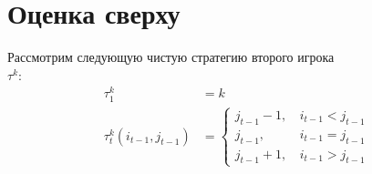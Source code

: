 \section{Оценка сверху}
\label{sec:upper_bound}
Рассмотрим следующую чистую стратегию второго игрока\\
$ \tau^k $:
\begin{equation}
\label{eq:strategy:sp}
\begin{aligned}
\tau_1^k &= k \\
\tau_t^k(i_{t-1}, j_{t-1}) &= \begin{cases}
    j_{t-1} - 1, &\, i_{t-1} < j_{t-1} \\
    j_{t-1}, &\, i_{t-1} = j_{t-1} \\
    j_{t-1} + 1, &\, i_{t-1} > j_{t-1}
\end{cases}
\end{aligned}
\end{equation}

